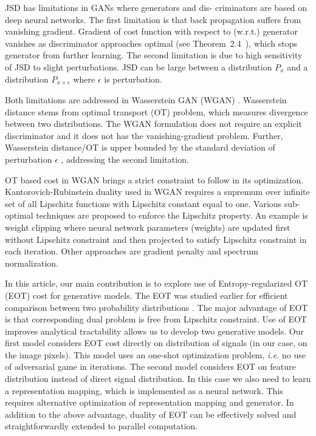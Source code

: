 JSD has limitations in GANs where generators and dis-
criminators are based on deep neural networks. The first limitation is that back
propagation suffers from vanishing gradient. Gradient of cost
function with respect to (w.r.t.) generator vanishes as
discriminator approaches optimal (see Theorem~2.4~\cite{2017arXiv170104862A}),
which stops generator from further learning. The second limitation is due to high sensitivity of JSD to slight perturbations. JSD can be large between a distribution $P_x$ and a distribution $P_{x+\epsilon}$ where $\epsilon$ is perturbation\cite{2017arXiv170104862A}. 

Both limitations are addressed in Wasserstein GAN (WGAN)
\cite{2017arXiv170107875A}. Wasserstein distance stems from
optimal transport (OT) problem, which measures divergence between two
distributions. The WGAN formulation does not require an explicit
discriminator and it does not has the vanishing-gradient problem. Further,
Wasserstein distance/OT is upper bounded by the standard deviation of perturbation $\epsilon$
\cite{2017arXiv170104862A}, addressing the second limitation. 

OT based cost in WGAN brings a strict constraint to follow in its optimization.
Kantorovich-Rubinstein duality used in WGAN requires a supremum over
infinite set of all Lipschitz functions with Lipschitz constant equal
to one. Various sub-optimal techniques are proposed to enforce the
Lipschitz property. An example is weight clipping
\cite{2017arXiv170107875A} where neural network parameters (weights)
are updated first without Lipschitz constraint and then projected to
satisfy Lipschitz constraint in each iteration. Other approaches are
gradient penalty\cite{2017arXiv170400028G} and spectrum normalization\cite{2018arXiv180205957M}.

In this article, our main contribution is to explore use of Entropy-regularized OT (EOT) cost for generative models. 
The EOT was studied earlier for efficient comparison between two probability distributions \cite{2013arXiv1306.0895C}. 
The major advantage of EOT is
that corresponding dual problem is free from Lipschitz constraint. Use of EOT improves
analytical tractability allows us to develop two generative models. Our
first model considers EOT cost directly on distribution of signals (in our case,
on the image pixels). This model uses an one-shot optimization problem, \emph{i.e.} no use of adversarial game in iterations. The second model
considers EOT on feature distribution instead of direct signal
distribution. In this case we also need to learn a representation
mapping, which is implemented as a neural network. 
This requires alternative optimization of representation mapping and
generator. In addition to the above advantage, duality of EOT can be
effectively solved and straightforwardly extended to parallel computation. 



